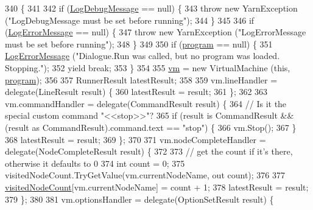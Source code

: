 \begin{DoxyCode}
340                                                                                              \{
341 
342             \textcolor{keywordflow}{if} (\hyperlink{a00088_a381f48bb0fbb294f8cf44ca57f11be31}{LogDebugMessage} == null) \{
343                 \textcolor{keywordflow}{throw} \textcolor{keyword}{new} YarnException (\textcolor{stringliteral}{"LogDebugMessage must be set before running"});
344             \}
345 
346             \textcolor{keywordflow}{if} (\hyperlink{a00088_a9801e83dd044d6498fdf6ebcc6bec5ac}{LogErrorMessage} == null) \{
347                 \textcolor{keywordflow}{throw} \textcolor{keyword}{new} YarnException (\textcolor{stringliteral}{"LogErrorMessage must be set before running"});
348             \}
349 
350             \textcolor{keywordflow}{if} (\hyperlink{a00088_a0a1cca92325f430425d784d416cb5c2b}{program} == null) \{
351                 \hyperlink{a00088_a9801e83dd044d6498fdf6ebcc6bec5ac}{LogErrorMessage} (\textcolor{stringliteral}{"Dialogue.Run was called, but no program was loaded.
       Stopping."});
352                 yield \textcolor{keywordflow}{break};
353             \}
354 
355             \hyperlink{a00088_a8c1319357a9df6cff051328fb33224c7}{vm} = \textcolor{keyword}{new} VirtualMachine (\textcolor{keyword}{this}, \hyperlink{a00088_a0a1cca92325f430425d784d416cb5c2b}{program});
356 
357             RunnerResult latestResult;
358 
359             vm.lineHandler = delegate(LineResult result) \{
360                 latestResult = result;
361             \};
362 
363             vm.commandHandler = delegate(CommandResult result) \{
364                 \textcolor{comment}{// Is it the special custom command "<<stop>>"?}
365                 \textcolor{keywordflow}{if} (result is CommandResult && (result as CommandResult).command.text == \textcolor{stringliteral}{"stop"}) \{
366                     vm.Stop();
367                 \}
368                 latestResult = result;
369             \};
370 
371             vm.nodeCompleteHandler = delegate(NodeCompleteResult result) \{
372 
373                 \textcolor{comment}{// get the count if it's there, otherwise it defaults to 0}
374                 \textcolor{keywordtype}{int} count = 0;
375                 visitedNodeCount.TryGetValue(vm.currentNodeName, out count);
376 
377                 \hyperlink{a00088_aae9e64354066a1e2fa130629959d772b}{visitedNodeCount}[vm.currentNodeName] = count + 1;
378                 latestResult = result;
379             \};
380 
381             vm.optionsHandler = delegate(OptionSetResult result) \{

\end{DoxyCode}
